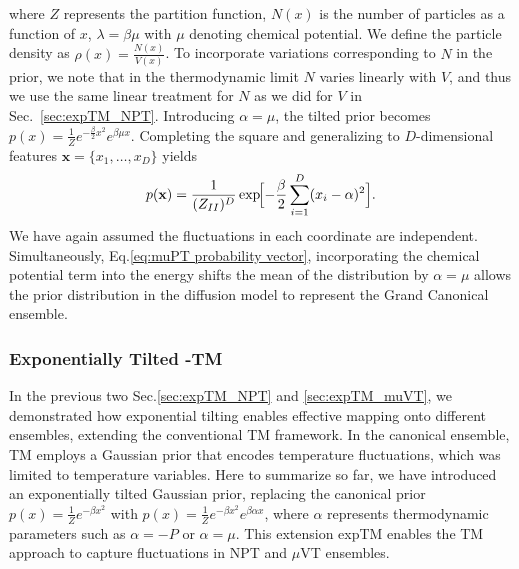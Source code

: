 \documentclass[aip,jcp,reprint,longbibliography]{revtex4-1}
\begin{document}
\noindent where $Z$ represents the partition function, $N(x)$ is the number of particles as a function of $x$,  $\lambda = \beta \mu$ with $\mu$ denoting chemical potential. We define the particle density as $\rho(x) = \frac{N(x)}{V(x)}$. To incorporate variations corresponding to $N$ in the prior, we note that in the thermodynamic limit $N$ varies linearly with $V$, and thus we use the same linear treatment for $N$ as we did for $V$ in Sec.~\ref{sec:expTM_NPT}. Introducing $\alpha = \mu$, the tilted prior becomes $p(x) =\frac{1}{Z} e^{-\frac{\beta}{2} x^2} e^{\beta \mu x}.$ Completing the square and generalizing to $D$-dimensional features 
$\mathbf{x} = \{x_1,\ldots,x_D\}$ yields
\begin{equation}
p(\mathbf{x})
=
\frac{1}{(Z_{II})^D}
\exp\!\Bigl[-\frac{\beta}{2}
\sum_{i=1}^{D} (x_i - \alpha)^2 \Bigr].
\label{eq:muPT probability vector}
\end{equation}
We have again assumed the fluctuations in each coordinate are independent. Simultaneously, Eq.\ref{eq:muPT probability vector}, incorporating the chemical potential term into the energy shifts the mean of the distribution by $\alpha =\mu$ allows the prior distribution in the diffusion model to represent the Grand Canonical ensemble.

\subsubsection{Exponentially Tilted -TM }
In the previous two Sec.\ref{sec:expTM_NPT} and \ref{sec:expTM_muVT}, we demonstrated how exponential tilting enables effective mapping onto different ensembles, extending the conventional TM framework. In the canonical ensemble, TM employs a Gaussian prior that encodes temperature fluctuations, which was limited to temperature variables. Here to summarize so far, we have introduced an exponentially tilted Gaussian prior, replacing the canonical prior $ p(x) = \frac{1}{Z} e^{-\beta x^2} $ with $ p(x) = \frac{1}{Z} e^{-\beta x^2} e^{\beta\alpha x} $, where $\alpha$ represents thermodynamic parameters such as $\alpha = -P$ or $\alpha = \mu$. This extension expTM enables the TM approach to capture fluctuations in NPT and $\mu$VT ensembles.
\end{document}
